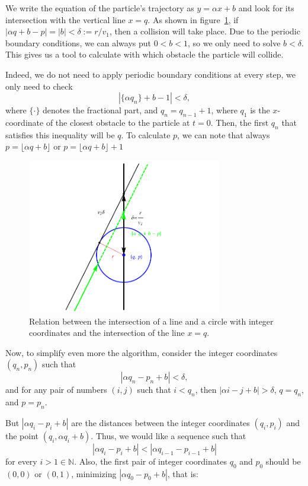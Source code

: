 \documentclass[pre,amsmath,amssymb, twocolumn, showpacs]{revtex4-1}
\begin{document}
We write the equation of the particle's trajectory as $y=\alpha x+b$ and look for its intersection with the vertical line $x=q$. As shown in figure~\ref{fig:circle}, if $|\alpha q+b-p| = |b| < \delta := r/v_1$, then a collision will take place. Due to the periodic boundary conditions, we can always put $0 < b < 1$, so we only need to solve $b<\delta$. This gives us a tool to calculate with which obstacle the particle will collide. 

Indeed, we do not need to apply periodic boundary conditions at every step, we only need to check 
\begin{equation}
|\{ \alpha  q_n \}+b -1|< \delta, 
\label{eq:master}
\end{equation}
where $\{ \cdot \}$ denotes the fractional part, and $q_n=q_{n-1}+1$, where $q_1$ is the $x$-coordinate of the closest obstacle to the particle at $t=0$. Then, the first $q_n$ that satisfies this inequality will be $q$. To calculate $p$, we can note that always $p=\lfloor \alpha q +b\rfloor$ or $p=\lfloor \alpha q +b\rfloor+1$

\begin{figure}
\centering
\includegraphics [width=240pt]{fig01.pdf}
\caption{Relation between the intersection of a line and a circle with integer coordinates and the intersection of the line $x = q$. }
\label{fig:circle}
\end{figure}


Now, to simplify even more the algorithm, consider the integer coordinates $(q_n, p_n)$ such that
\begin{equation}
|\alpha q_n -p_n + b|< \delta,
\label{eq:1}
\end{equation}
and for any pair of numbers $(i,j)$ such that $i<q_n$, then $|\alpha i -j+ b|> \delta$,  $q=q_n$, and $p=p_n$. 
 
But $|\alpha q_i - p_i + b|$ are the distances between the integer coordinates $(q_i, p_i)$ and the point $( q_i ,\alpha q_i + b)$. Thus, we would like a sequence such that  
\begin{equation}
|\alpha q_i - p_i + b|<|\alpha q_{i-1} - p_{i-1} + b|
\label{eq:iteration}
\end{equation}
for every $i>1 \in   \mathbb{N}$. Also, the first pair of integer coordinates $q_0$ and $p_0$ should be $(0, 0)$ or $(0, 1)$, minimizing $|\alpha q_0 - p_0 + b|$, that is:
\end{document}
